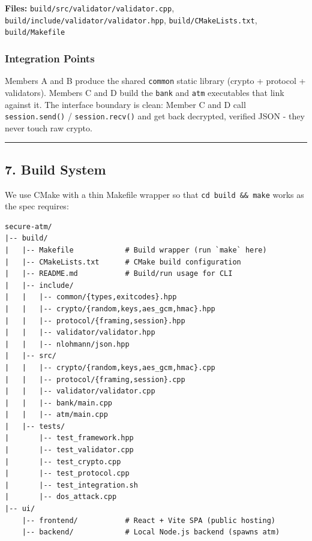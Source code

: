 \documentclass[
]{article}
\begin{document}
\textbf{Files:} \texttt{build/src/validator/validator.cpp},
\texttt{build/include/validator/validator.hpp},
\texttt{build/CMakeLists.txt}, \texttt{build/Makefile}

\hypertarget{integration-points}{%
\subsubsection{Integration Points}\label{integration-points}}

Members A and B produce the shared \texttt{common} static library
(crypto + protocol + validators). Members C and D build the
\texttt{bank} and \texttt{atm} executables that link against it. The
interface boundary is clean: Member C and D call \texttt{session.send()}
/ \texttt{session.recv()} and get back decrypted, verified JSON - they
never touch raw crypto.

\begin{center}\rule{0.5\linewidth}{0.5pt}\end{center}

\hypertarget{build-system}{%
\subsection{7. Build System}\label{build-system}}

We use CMake with a thin Makefile wrapper so that
\texttt{cd\ build\ \&\&\ make} works as the spec requires:

\begin{verbatim}
secure-atm/
|-- build/
|   |-- Makefile            # Build wrapper (run `make` here)
|   |-- CMakeLists.txt      # CMake build configuration
|   |-- README.md           # Build/run usage for CLI
|   |-- include/
|   |   |-- common/{types,exitcodes}.hpp
|   |   |-- crypto/{random,keys,aes_gcm,hmac}.hpp
|   |   |-- protocol/{framing,session}.hpp
|   |   |-- validator/validator.hpp
|   |   |-- nlohmann/json.hpp
|   |-- src/
|   |   |-- crypto/{random,keys,aes_gcm,hmac}.cpp
|   |   |-- protocol/{framing,session}.cpp
|   |   |-- validator/validator.cpp
|   |   |-- bank/main.cpp
|   |   |-- atm/main.cpp
|   |-- tests/
|       |-- test_framework.hpp
|       |-- test_validator.cpp
|       |-- test_crypto.cpp
|       |-- test_protocol.cpp
|       |-- test_integration.sh
|       |-- dos_attack.cpp
|-- ui/
    |-- frontend/           # React + Vite SPA (public hosting)
    |-- backend/            # Local Node.js backend (spawns atm)
\end{verbatim}
\end{document}
